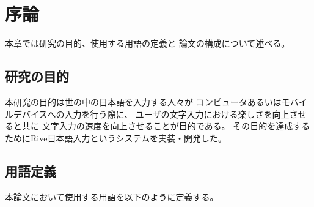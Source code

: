 \chapter{序論}
\label{chap:introduction}
本章では研究の目的、使用する用語の定義と
論文の構成について述べる。

\newpage
\section{研究の目的}
本研究の目的は世の中の日本語を入力する人々が
コンピュータあるいはモバイルデバイスへの入力を行う際に、
ユーザの文字入力における楽しさを向上させると共に
文字入力の速度を向上させることが目的である。
その目的を達成するためにRive日本語入力というシステムを実装・開発した。

\section{用語定義}
本論文において使用する用語を以下のように定義する。

